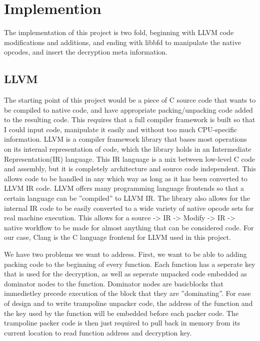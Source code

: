 \documentclass{article}
\begin{document}
\section{Implemention}
The implementation of this project is two fold, beginning with LLVM code modifications and additions, and ending with libbfd to manipulate the native opcodes, and insert the decryption meta information.

\newline

\subsection{LLVM}
The starting point of this project would be a piece of C source code that wants to be compiled to native code, and have appropriate packing/unpacking code added to the resulting code. This requires that a full compiler framework is built so that I could input code, manipulate it easily and without too much CPU-specific information. LLVM is a compiler framework library that bases most operations on its internal representation of code, which the library holds in an Intermediate Representation(IR) language. This IR language is a mix between low-level C code and assembly, but it is completely architecture and source code independent. This allows code to be handled in any which way as long as it has been converted to LLVM IR code. LLVM offers many programming language frontends so that a certain language can be ''compiled'' to LLVM IR. The library also allows for the internal IR code to be easily converted to a wide variety of native opcode sets for real machine execution. This allows for a source -> IR -> Modify -> IR -> native workflow to be made for almost anything that can be considered code.    For our case, Clang is the C language frontend for LLVM used in this project.

We have two problems we want to address. First, we want to be able to adding packing code to the beginning of every function. Each function has a seperate key that is used for the decryption, as well as seperate unpacked code embedded as dominator nodes to the function. Dominator nodes are basicblocks that immedietley precede execution of the block that they are ''dominating''. For ease of design and to write trampoline unpacker code, the address of the function and the key used by the function will be embedded before each packer code. The trampoline packer code is then just required to pull back in memory from its current location to read function address and decryption key. 
\end{document}
